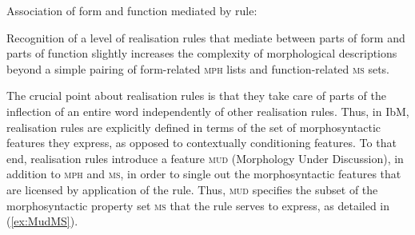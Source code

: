 \documentclass[output=paper
	        ,collection
	        ,collectionchapter
 	        ,biblatex
                ,babelshorthands
                ,newtxmath
                ,draftmode
                ,colorlinks, citecolor=brown
]{langscibook}
\begin{document}
\begin{exe}
\begin{xlist}
\eas
\label{fig:WordRR}
Association of form and function mediated by rule:\\
%
%
%
\zs

Recognition of a level of realisation rules that mediate between parts
of form and parts of function slightly increases the complexity of
morphological descriptions beyond a simple pairing of form-related
\textsc{mph} lists and function-related \textsc{ms} sets. 

The crucial point about realisation rules is that they take care of
parts of the inflection of an entire word independently of other
realisation rules. Thus, in IbM, realisation rules are explicitly
defined in terms of the set of morphosyntactic features they express,
as opposed to contextually conditioning features. To that end, realisation
rules introduce a feature \textsc{mud} (Morphology Under Discussion),
in addition to \textsc{mph} and \textsc{ms}, in order to single out
the morphosyntactic features that are licensed by application of the
rule. Thus, \textsc{mud} specifies the subset of the morphosyntactic
property set \textsc{ms} that the rule serves to express, as detailed
in (\ref{ex:MudMS}). 

\begin{exe}
  \ex \label{ex:MudMS}


\end{exe}
\end{xlist}
\end{exe}
\end{document}
